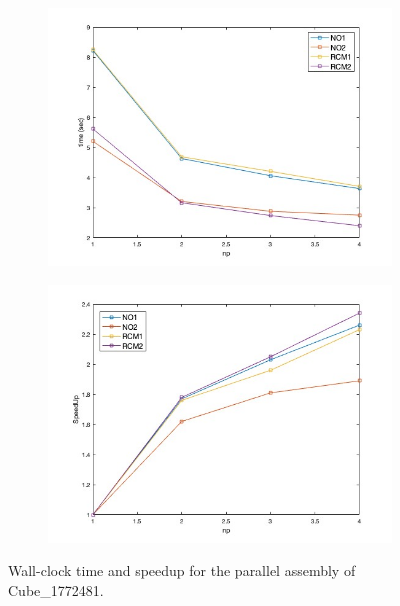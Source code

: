 \documentclass[hidelinks]{article}
\begin{document}
\begin{figure}[H]
    \begin{subfigure}{0.45\textwidth}
        \includegraphics[width=\textwidth]{pic/timeAssembly.jpg}
    \end{subfigure} \hfill
    \begin{subfigure}{0.45\textwidth}
        \includegraphics[width=\textwidth]{pic/speedupAssembly.jpg}
    \end{subfigure} 
    \caption{Wall-clock time and speedup for the parallel assembly of Cube\_1772481.}
\end{figure}
\end{document}
